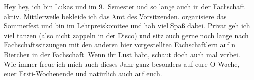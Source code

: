 \begin{multicols*}{2}
{Hey hey, ich bin Lukas und im 9.~Semester und so lange auch in der Fachschaft aktiv.
Mittlerweile bekleide ich das Amt des Vorsitzenden, organisiere das Sommerfest und bin im Lehrpreiskomitee und hab viel Spaß dabei.
Privat geh ich viel tanzen (also nicht zappeln in der Disco) und sitz auch gerne noch lange nach Fachschaftssitzungen mit den anderen hier vorgestellten Fachschaftlern auf n Bierchen in der Fachschaft.
Wenn ihr Lust habt, schaut doch auch mal vorbei.
Wie immer freue ich mich auch dieses Jahr ganz besonders auf eure O-Woche, euer Ersti-Wochenende und natürlich auch auf euch.}


\end{multicols*}
